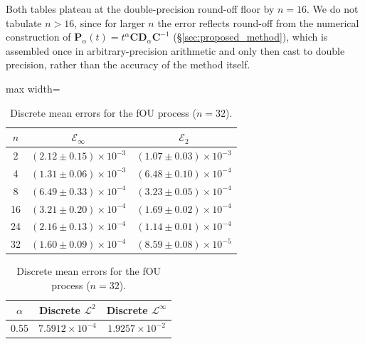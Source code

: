 \documentclass[11pt, a4paper]{article}
\theoremstyle{theoremstyle}
\theoremstyle{definitionstyle}
\begin{document}
Both tables plateau at the double-precision round-off floor by $n=16$. We do not tabulate $n>16$, since for larger $n$ the error reflects round-off from the numerical construction of $\mathbf P_\alpha(t) = t^\alpha\mathbf C\mathbf D_\alpha\mathbf C^{-1}$ (\S\ref{sec:proposed_method}), which is assembled once in arbitrary-precision arithmetic and only then cast to double precision, rather than the accuracy of the method itself.

\begin{table}[htbp]
    \centering
    \begin{minipage}[t]{0.48\textwidth}
        \centering
        \caption{Trajectory errors $\pm$ resampled Monte Carlo standard error for the fOU process ($\alpha = 1.0$).}
        \label{tab:ou_traj}
        \begin{adjustbox}{max width=\textwidth}
        \begin{tabular}{ccc}
            \toprule
            $n$ & $\mathcal E_\infty$ & $\mathcal E_2$ \\
            \midrule
            2  & $(2.12 \pm 0.15) \times 10^{-3}$ & $(1.07 \pm 0.03) \times 10^{-3}$ \\
            4  & $(1.31 \pm 0.06) \times 10^{-3}$ & $(6.48 \pm 0.10) \times 10^{-4}$ \\
            8  & $(6.49 \pm 0.33) \times 10^{-4}$ & $(3.23 \pm 0.05) \times 10^{-4}$ \\
            16 & $(3.21 \pm 0.20) \times 10^{-4}$ & $(1.69 \pm 0.02) \times 10^{-4}$ \\
            24 & $(2.16 \pm 0.13) \times 10^{-4}$ & $(1.14 \pm 0.01) \times 10^{-4}$ \\
            32 & $(1.60 \pm 0.09) \times 10^{-4}$ & $(8.59 \pm 0.08) \times 10^{-5}$ \\
            \bottomrule
        \end{tabular}
        \end{adjustbox}
    \end{minipage}
    \hfill
    \begin{minipage}[t]{0.48\textwidth}
        \centering
        \caption{Discrete mean errors for the fOU process ($n = 32$).}
        \label{tab:ou_mean}
        \begin{tabular}{ccc}
            \toprule
            $\alpha$ & Discrete $\mathcal L^2$ & Discrete $\mathcal L^\infty$ \\
            \midrule
            0.55 & $7.5912 \times 10^{-4}$ & $1.9257 \times 10^{-2}$ \\

\end{tabular}
\end{minipage}
\end{table}
\end{document}
